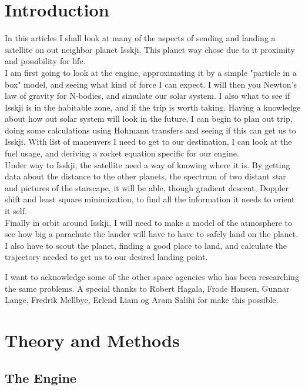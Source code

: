 \documentclass[a4paper, 10pt]{article}
\begin{document}
\tableofcontents

\section{Introduction}

In this articles I shall look at many of the aspects of sending and landing a satellite on out neighbor planet Isskji. This planet way chose due to it proximity and possibility for life.\\

I am first going to look at the engine, approximating it by a simple "particle in a box" model, and seeing what kind of force I can expect. I will then you Newton's law of gravity for N-bodies, and simulate our solar system. I also what to see if Isskji is in the habitable zone, and if the trip is worth taking. Having a knowledge about how out solar system will look in the future, I can begin to plan out trip, doing some calculations using Hohmann transfers and seeing if this can get us to Isskji. With list of maneuvers I need to get to our destination, I can look at the fuel usage, and deriving a rocket equation specific for our engine. \\

Under way to Isskji, the satellite need a way of knowing where it is. By getting data about the distance to the other planets, the spectrum of two distant star and pictures of the starscape, it will be able, though gradient descent, Doppler shift and least square minimization, to find all the information it needs to orient it self.\\

Finally in orbit around Isskji, I will need to make a model of the atmosphere to see how big a parachute the lander will have to have to safely land on the planet. I also have to scout the planet, finding a good place to land, and calculate the trajectory needed to get us to our desired landing point.

I want to acknowledge some of the other space agencies who has been researching the same problems. A special thanks to Robert Hagala, Frode Hansen, Gunnar Lange, Fredrik Mellbye, Erlend Liam og Aram Salihi for make this possible.

\section{Theory and Methods}

\subsection{The Engine}
\end{document}
